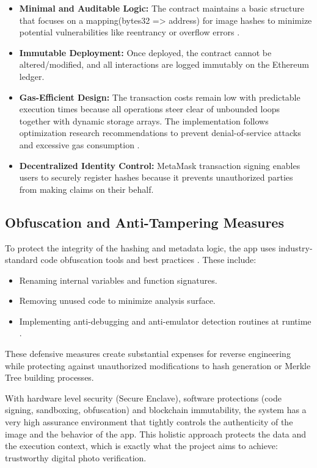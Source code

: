\begin{itemize}
    \item {\textbf{Minimal and Auditable Logic:}} The contract maintains a basic structure that focuses on a mapping(bytes32 => address) for image hashes to minimize potential vulnerabilities like reentrancy or overflow errors \cite{cheng2020}.
    \item {\textbf{Immutable Deployment:}} Once deployed, the contract cannot be altered/modified, and all interactions are logged immutably on the Ethereum ledger.
    \item {\textbf{Gas-Efficient Design:}} The transaction costs remain low with predictable execution times because all operations steer clear of unbounded loops together with dynamic storage arrays. The implementation follows optimization research recommendations to prevent denial-of-service attacks and excessive gas consumption \cite{chunmiao2021} \cite{Nguyen2022GasSaverAT}.
    \item {\textbf{Decentralized Identity Control:}} MetaMask transaction signing enables users to securely register hashes because it prevents unauthorized parties from making claims on their behalf.
\end{itemize}

\subsection{Obfuscation and Anti-Tampering Measures}
To protect the integrity of the hashing and metadata logic, the app uses industry-standard code obfuscation tools and best practices \cite{wandCodeObfuscation}. These include:

\begin{itemize}
    \item Renaming internal variables and function signatures.
    \item Removing unused code to minimize analysis surface.
    \item Implementing anti-debugging and anti-emulator detection routines at runtime .
\end{itemize}

These defensive measures create substantial expenses for reverse engineering while protecting against unauthorized modifications to hash generation or Merkle Tree building processes.


With hardware level security (Secure Enclave), software protections (code signing, sandboxing, obfuscation) and blockchain immutability, the system has a very high assurance environment that tightly controls the authenticity of the image and the behavior of the app. This holistic approach protects the data and the execution context, which is exactly what the project aims to achieve: trustworthy digital photo verification.